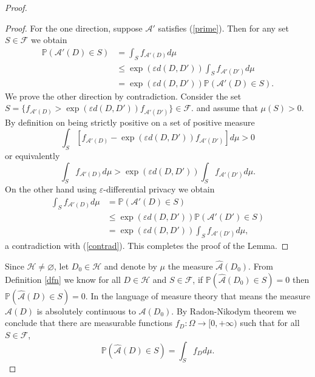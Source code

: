 \documentclass[12pt,a4paper]{article}
\numberwithin{equation}{section}
\numberwithin{equation}{section}
\renewcommand{\epsilon}{\varepsilon}
\newcommand{\1}{{\text{\Large $\mathfrak 1$}}}
\renewcommand{\emptyset}{\varnothing}
\newcommand{\2}[1]{{\text{\Large $\mathfrak 1$}\!\left(#1\right)}}
\begin{document}
\begin{proof}
\begin{proof}
For the one direction, suppose $\mathcal{A}'$ satisfies (\ref{prime}). Then for any set $S \in \mathcal{F}$ we obtain
 \begin{align*} \mathbb{P}\left(\mathcal{A}'(D) \in S \right) &=\int_{S}  f_{\mathcal{A}'(D)} d\mu \\
& \leq \exp \left(\epsilon d(D,D') \right) \int_{ S} f_{\mathcal{A}'(D')} d\mu\\
&= \exp \left(\epsilon d(D,D') \right)\mathbb{P}\left(\mathcal{A}'(D) \in S \right).
 \end{align*}We prove the other direction by contradiction. Consider the set $S= \{ f_{\mathcal{A}'(D)} > \exp \left(\epsilon d(D,D') \right) f_{\mathcal{A}'(D')} \} \in \mathcal{F}$. and assume that $\mu (S)>0$. By definition on being strictly positive on a set of positive measure \begin{equation*}\int_S \left[f_{\mathcal{A'}(D)} -\exp \left(\epsilon d(D,D') \right) f_{\mathcal{A}'(D')}\right]  d \mu>0 \end{equation*}or equivalently\begin{equation}\label{contrad}\int_S f_{\mathcal{A'}(D)}d \mu > \exp \left(\epsilon d(D,D') \right) \int_Sf_{\mathcal{A}'(D')}  d \mu. \end{equation} On the other hand using $\epsilon$-differential privacy we obtain
\begin{align*}  \int_S f_{\mathcal{A'}(D)}d \mu & =\mathbb{P}(\mathcal{A'}(D) \in S) \\\
&\leq \exp \left(\epsilon d(D,D') \right)\mathbb{P}(\mathcal{A'}(D') \in S) \\
&= \exp \left(\epsilon d(D,D') \right) \int_Sf_{\mathcal{A}'(D')}  d \mu,
\end{align*} a contradiction with (\ref{contrad}). This completes the proof of the Lemma.
\end{proof}
Since $\mathcal{H} \not  = \emptyset$, let $D_0 \in \mathcal{H}$ and denote by $\mu$ the measure $\hat{\mathcal{A}}(D_0)$. From Definition \ref{dfn} we know for all $D \in \mathcal{H}$ and $S \in \mathcal{F}$, if $\mathbb{P}\left( \hat{\mathcal{A}}(D_0) \in S\right) =0$ then $\mathbb{P}\left( \hat{\mathcal{A}}(D) \in S\right) =0$. In the language of measure theory that means the measure $\hat{\mathcal{A}}(D)$ is absolutely continuous to $\mathcal{A}(D_0)$. By Radon-Nikodym theorem we conclude that there are measurable functions $f_D: \Omega \rightarrow [0,+\infty)$ such that for all $S \in \mathcal{F}$, \begin{equation}\mathbb{P}\left( \hat{\mathcal{A}}(D) \in S\right) = \int_S f_D d\mu. \end{equation}


\end{proof}
\end{document}
